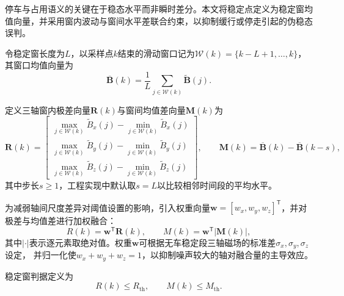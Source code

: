 \documentclass{xdupgthesis}
\begin{document}
停车与占用语义的关键在于稳态水平而非瞬时差分。本文将稳定点定义为稳定窗均值向量，并采用窗内波动与窗间水平差联合约束，以抑制缓行或停走引起的伪稳态误判。

令稳定窗长度为$L$，以采样点$k$结束的滑动窗口记为$\mathcal{W}(k)=\{k-L+1,\ldots,k\}$，其窗口均值向量为
\begin{equation}
\overline{\mathbf{B}}(k)=\frac{1}{L}\sum_{j\in\mathcal{W}(k)}\widetilde{\mathbf{B}}(j).
\label{eq:ch4_mean}
\end{equation}

定义三轴窗内极差向量$\mathbf{R}(k)$与窗间均值差向量$\mathbf{M}(k)$为
\begin{equation}
\mathbf{R}(k)=
\begin{bmatrix}
\max\limits_{j \in \mathcal{W}(k)}\widetilde{B}_x(j) - \min\limits_{j \in \mathcal{W}(k)}\widetilde{B}_x(j)\\
\max\limits_{j \in \mathcal{W}(k)}\widetilde{B}_y(j) - \min\limits_{j \in \mathcal{W}(k)}\widetilde{B}_y(j)\\
\max\limits_{j \in \mathcal{W}(k)}\widetilde{B}_z(j) - \min\limits_{j \in \mathcal{W}(k)}\widetilde{B}_z(j)
\end{bmatrix},
\qquad
\mathbf{M}(k)=\overline{\mathbf{B}}(k)-\overline{\mathbf{B}}(k-s),
\label{eq:ch4_range_mean_vec}
\end{equation}
其中步长$s\ge 1$，工程实现中默认取$s=L$以比较相邻时间段的平均水平。

为减弱轴间尺度差异对阈值设置的影响，引入权重向量$\mathbf{w}=[w_x,w_y,w_z]^{\mathsf{T}}$，并对极差与均值差进行加权融合：
\begin{equation}
R(k)=\mathbf{w}^{\mathsf{T}}\mathbf{R}(k),\qquad
M(k)=\mathbf{w}^{\mathsf{T}}\bigl|\mathbf{M}(k)\bigr|,
\label{eq:ch4_RM_weight}
\end{equation}
其中$|\cdot|$表示逐元素取绝对值。权重$\mathbf{w}$可根据无车稳定段三轴磁场的标准差$\sigma_x,\sigma_y,\sigma_z$设定，
并归一化使$w_x+w_y+w_z=1$，以抑制噪声较大的轴对融合量的主导效应。

稳定窗判据定义为
\begin{equation}
R(k)\le R_{\mathrm{th}},\qquad M(k)\le M_{\mathrm{th}}.
\label{eq:ch4_stable_cond}
\end{equation}
\end{document}
